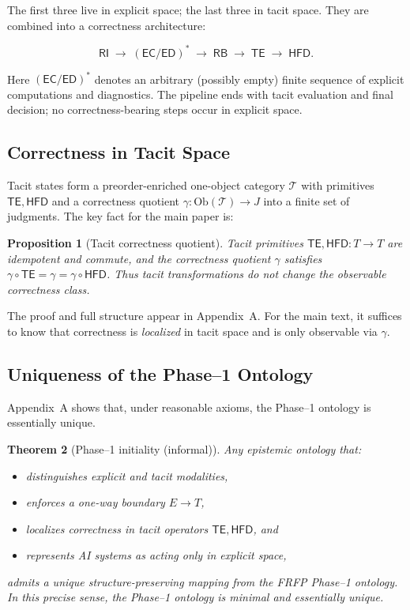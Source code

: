 \documentclass[11pt]{article}
\newtheorem{theorem}{Theorem}[section]
\newtheorem{proposition}[theorem]{Proposition}
\theoremstyle{definition}
\newcommand{\FRFP}{FRFP}
\newcommand{\Tcat}{\mathcal{T}} %
\newcommand{\RB}{\mathsf{RB}}   %
\newcommand{\RI}{\mathsf{RI}}
\newcommand{\EC}{\mathsf{EC}}
\newcommand{\ED}{\mathsf{ED}}
\newcommand{\TE}{\mathsf{TE}}
\newcommand{\HFD}{\mathsf{HFD}}
\newcommand{\Obj}{\mathrm{Ob}}
\begin{document}
The first three live in explicit space; the last three in tacit space.
They are combined into a correctness architecture:

\[
\RI \;\to\; (\EC/\ED)^\ast \;\to\; \RB \;\to\; \TE \;\to\; \HFD.
\]

Here \((\EC/\ED)^\ast\) denotes an arbitrary (possibly empty) finite
sequence of explicit computations and diagnostics. The pipeline ends
with tacit evaluation and final decision; no correctness-bearing steps
occur in explicit space.

\subsection{Correctness in Tacit Space}

Tacit states form a preorder-enriched one-object category \(\Tcat\) with
primitives \(\TE,\HFD\) and a correctness quotient
\(\gamma:\Obj(\Tcat)\to J\) into a finite set of judgments. The key fact
for the main paper is:

\begin{proposition}[Tacit correctness quotient]
Tacit primitives \(\TE,\HFD:T\to T\) are idempotent and commute, and
the correctness quotient \(\gamma\) satisfies
\(\gamma\circ\TE=\gamma=\gamma\circ\HFD\). Thus tacit transformations do
not change the observable correctness class.
\end{proposition}

The proof and full structure appear in Appendix~A. For the main text, it
suffices to know that correctness is \emph{localized} in tacit space and
is only observable via \(\gamma\).

\subsection{Uniqueness of the Phase--1 Ontology}

Appendix~A shows that, under reasonable axioms, the Phase--1 ontology is
essentially unique.

\begin{theorem}[Phase--1 initiality (informal)]
Any epistemic ontology that:
\begin{itemize}[leftmargin=2em]
  \item distinguishes explicit and tacit modalities,
  \item enforces a one-way boundary \(E\to T\),
  \item localizes correctness in tacit operators \(\TE,\HFD\), and
  \item represents AI systems as acting only in explicit space,
\end{itemize}
admits a unique structure-preserving mapping from the \FRFP{}
Phase--1 ontology. In this precise sense, the Phase--1 ontology is
minimal and essentially unique.
\end{theorem}
\end{document}
